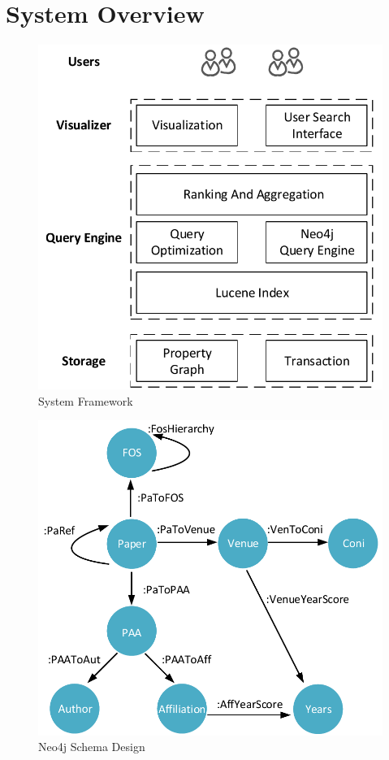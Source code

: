 \section{System Overview}
\label{sec-system}

\begin{figure}
\centering
\includegraphics[width=0.9\columnwidth]{systemFrame.pdf}
\caption{System Framework}
\label{fig:frame}
\vspace{-2ex}
\end{figure}


\begin{figure}
\centering
\includegraphics[width=0.9\columnwidth]{neo4jSchema.pdf}
\caption{Neo4j Schema Design}
\label{fig:schema}
\vspace{-3ex}
\end{figure}

